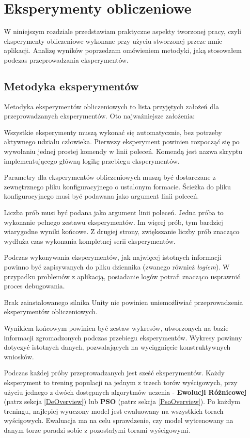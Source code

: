 \chapter{Eksperymenty obliczeniowe}
\label{ExperimentsChapter}

W niniejszym rozdziale przedstawiam praktyczne aspekty tworzonej pracy, czyli eksperymenty obliczeniowe wykonane przy użyciu stworzonej przeze mnie aplikacji. Analizę wyników poprzedzam omówieniem metodyki, jaką stosowałem podczas przeprowadzania eksperymentów.

\section{Metodyka eksperymentów}
Metodyka eksperymentów obliczeniowych to lista przyjętych założeń dla przeprowadzanych eksperymentów. Oto najważniejsze założenia:
\begin{enumerate*}
\item Wszystkie eksperymenty muszą wykonać się automatycznie, bez potrzeby aktywnego udziału człowieka. Pierwszy eksperyment powinien rozpocząć się po wywołaniu jednej prostej komendy w linii poleceń. Komendą jest nazwa skryptu implementującego główną logikę przebiegu eksperymentów.
\item Parametry dla eksperymentów obliczeniowych muszą być dostarczane z zewnętrznego pliku konfiguracyjnego o ustalonym formacie. Ścieżka do pliku konfiguracyjnego musi być podawana jako argument linii poleceń.
\item Liczba prób musi być podana jako argument linii poleceń. Jedna próba to wykonanie pełnego zestawu eksperymentów. Im więcej prób, tym bardziej wiarygodne wyniki końcowe. Z drugiej strony, zwiększanie liczby prób znacząco wydłuża czas wykonania kompletnej serii eksperymentów.
\item Podczas wykonywania eksperymentów, jak najwięcej istotnych informacji powinno być zapisywanych do pliku dziennika (zwanego również \textit{logiem}). W przypadku problemów z aplikacją, posiadanie logów potrafi znacząco usprawnić proces debugowania.
\item Brak zainstalowanego silnika Unity nie powinien uniemożliwiać przeprowadzenia eksperymentów obliczeniowych.
\item Wynikiem końcowym powinien być zestaw wykresów, utworzonych na bazie informacji zgromadzonych podczas przebiegu eksperymentów. Wykresy powinny dotyczyć istotnych danych, pozwalających na wyciągnięcie konstruktywnych wniosków.
\item Podczas każdej próby przeprowadzanych jest sześć eksperymentów. Każdy eksperyment to trening populacji na jednym z trzech torów wyścigowych, przy użyciu jednego z dwóch dostępnych algorytmów uczenia - \textbf{Ewolucji Różnicowej} (patrz sekcja \ref{DeOverview}) lub \textbf{PSO} (patrz sekcja \ref{PsoOverview}). Po każdym treningu, najlepiej wyuczony model jest ewaluowany na wszystkich torach wyścigowych. Ewaluacja ma na celu sprawdzenie, czy model wytrenowany na danym torze poradzi sobie z pozostałymi torami wyścigowymi.
\end{enumerate*}

